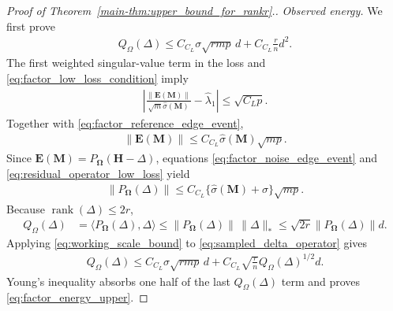 \documentclass[numsec,webpdf,modern,large,namedate]{oup-authoring-template}
\theoremstyle{plain}
\theoremstyle{remark}
\newcommand{\M}{\bm{M}}
\newcommand{\bH}{\bm{H}}
\newcommand{\bOmega}{\bm{\Omega}}
\newif\ifmarkchanges
\newenvironment{revision}{\begingroup\ifmarkchanges\color{red}\fi}{\endgroup}
\begin{document}
\begin{revision}
\begin{proof}[Proof of Theorem~\ref{main-thm:upper_bound_for_rankr}.]
\textit{Observed energy.} We first prove
\begin{align}
 Q_\Omega(\Delta)
 \le C_{C_L}\sigma\sqrt{rmp}\,d
       +C_{C_L}\frac rn d^2.
 \label{eq:factor_energy_upper}
\end{align}
The first weighted singular-value term in the loss and
\eqref{eq:factor_low_loss_condition} imply
\begin{align*}
    \left|
    \frac{\|\bm E(\M)\|}{\sqrt m\widehat\sigma(\M)}
    -\widehat\lambda_1
    \right|
    \le \sqrt{C_Lp}.
\end{align*}
Together with \eqref{eq:factor_reference_edge_event},
\begin{align}
\label{eq:residual_operator_low_loss}
    \|\bm E(\M)\|
    \le C_{C_L}\widehat\sigma(\M)\sqrt{mp}.
\end{align}
Since $\bm E(\M)=P_{\bOmega}(\bH-\Delta)$, equations
\eqref{eq:factor_noise_edge_event} and
\eqref{eq:residual_operator_low_loss} yield
\begin{align}
\label{eq:sampled_delta_operator}
    \|P_{\bOmega}(\Delta)\|
    \le C_{C_L}
    \{\widehat\sigma(\M)+\sigma\}\sqrt{mp}.
\end{align}
Because $\operatorname{rank}(\Delta)\le2r$,
\begin{align*}
    Q_{\Omega}(\Delta)
    &=\langle P_{\bOmega}(\Delta),\Delta\rangle
    \le \|P_{\bOmega}(\Delta)\|\,\|\Delta\|_*
    \le \sqrt{2r}\|P_{\bOmega}(\Delta)\|d.
\end{align*}
Applying \eqref{eq:working_scale_bound} to \eqref{eq:sampled_delta_operator} gives
\begin{align*}
    Q_{\Omega}(\Delta)
    \le C_{C_L}\sigma\sqrt{rmp}\,d
       +C_{C_L}\sqrt{\frac rn}
        Q_{\Omega}(\Delta)^{1/2}d.
\end{align*}
Young's inequality absorbs one half of the last
$Q_{\Omega}(\Delta)$ term and proves
\eqref{eq:factor_energy_upper}.


\end{proof}
\end{revision}
\end{document}
